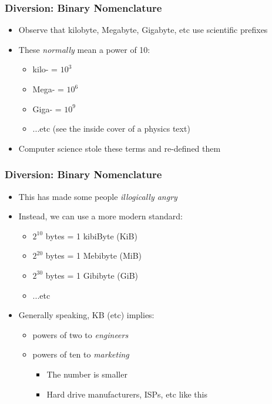 \documentclass[14pt]{beamer}
\begin{document}
\begin{frame}
\frametitle{Diversion: Binary Nomenclature}
\begin{itemize}
\item Observe that kilobyte, Megabyte, Gigabyte, etc use scientific prefixes
\item These \textit{normally} mean a power of 10:
	\begin{itemize}
		\item kilo- = $10^3$
		\item Mega- = $10^6$
		\item Giga- = $10^9$
		\item ...etc (see the inside cover of a physics text)
	\end{itemize}
\item Computer science stole these terms and re-defined them

\end{itemize}
\end{frame}

\begin{frame}
\frametitle{Diversion: Binary Nomenclature}
\begin{itemize}
\item This has made some people \textit{illogically angry}
\item Instead, we can use a more modern standard:
	\begin{itemize}
		\item $2^{10}$ bytes = 1 kibiByte (KiB)
		\item $2^{20}$ bytes = 1 Mebibyte (MiB)
		\item $2^{30}$ bytes = 1 Gibibyte (GiB)
		\item ...etc
	\end{itemize}
\item Generally speaking, KB (etc) implies:
	\begin{itemize}
		\item powers of two to \textit{engineers}
		\item powers of ten to \textit{marketing}
			\begin{itemize}
				\item The number is smaller
				\item Hard drive manufacturers, ISPs, etc like this
			\end{itemize}
	\end{itemize}
\end{itemize}
\end{frame}
\end{document}
